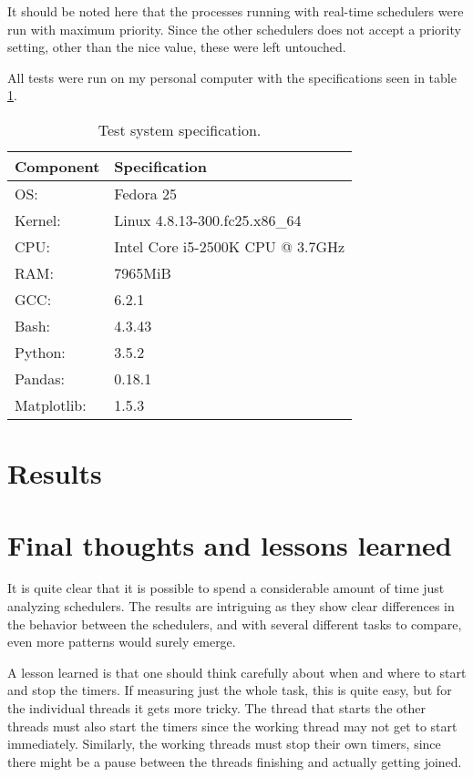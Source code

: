 \documentclass[12pt, a4paper]{article} %
\begin{document}
It should be noted here that the processes running with real-time schedulers were run with maximum priority.
Since the other schedulers does not accept a priority setting, other than the nice value, these were left untouched.

All tests were run on my personal computer with the specifications seen in table \ref{spec}.

\begin{table}[h]
	\centering
	\begin{tabular}{ll}
		Component & Specification \\
		\hline
		OS: & Fedora 25 \\
		Kernel: & Linux 4.8.13-300.fc25.x86\_64 \\
		CPU: & Intel Core i5-2500K CPU @ 3.7GHz \\
		RAM: & 7965MiB \\
		GCC: & 6.2.1 \\
		Bash: & 4.3.43 \\
		Python: & 3.5.2 \\
		Pandas: & 0.18.1 \\
		Matplotlib: & 1.5.3
	\end{tabular}
	\caption{Test system specification.}
	\label{spec}
\end{table}



\section{Results}



\section{Final thoughts and lessons learned}

It is quite clear that it is possible to spend a considerable amount of time just analyzing schedulers.
The results are intriguing as they show clear differences in the behavior between the schedulers, and with several different tasks to compare, even more patterns would surely emerge.

A lesson learned is that one should think carefully about when and where to start and stop the timers.
If measuring just the whole task, this is quite easy, but for the individual threads it gets more tricky.
The thread that starts the other threads must also start the timers since the working thread may not get to start immediately.
Similarly, the working threads must stop their own timers, since there might be a pause between the threads finishing and actually getting joined.
\end{document}
